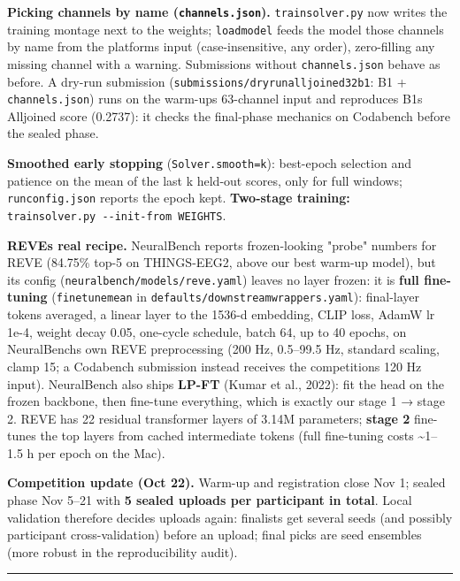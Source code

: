 \documentclass[
  11pt,
]{article}
\renewcommand{\_}{\oldunderscore\allowbreak}
\begin{document}
\textbf{Picking channels by name
(\texttt{channels.json}).}
\texttt{train\_solver.py} now writes the
training montage next to the weights;
\texttt{load\_model} feeds the model
those channels by name from the
platform\textquotesingle s input
(case-insensitive, any order),
zero-filling any missing channel with a
warning. Submissions without
\texttt{channels.json} behave as before.
A dry-run submission
(\texttt{submissions/dryrun\_alljoined32\_b1}:
B1 + \texttt{channels.json}) runs on the
warm-up\textquotesingle s 63-channel
input and reproduces
B1\textquotesingle s Alljoined score
(0.2737): it checks the final-phase
mechanics on Codabench before the sealed
phase.

\textbf{Smoothed early stopping}
(\texttt{Solver.smooth=k}): best-epoch
selection and patience on the mean of
the last k held-out scores, only for
full windows; \texttt{run\_config.json}
reports the epoch kept.
\textbf{Two-stage training:}
\texttt{train\_solver.py\ -\/-init-from\ WEIGHTS}.

\textbf{REVE\textquotesingle s real
recipe.} NeuralBench reports
frozen-looking "probe" numbers for REVE
(84.75\% top-5 on THINGS-EEG2, above our
best warm-up model), but its config
(\texttt{neuralbench/models/reve.yaml})
leaves no layer frozen: it is
\textbf{full fine-tuning}
(\texttt{finetune\_mean} in
\texttt{defaults/downstream\_wrappers.yaml}):
final-layer tokens averaged, a linear
layer to the 1536-d embedding, CLIP
loss, AdamW lr 1e-4, weight decay 0.05,
one-cycle schedule, batch 64, up to 40
epochs, on NeuralBench\textquotesingle s
own REVE preprocessing (200 Hz,
0.5--99.5 Hz, standard scaling, clamp
15; a Codabench submission instead
receives the
competition\textquotesingle s 120 Hz
input). NeuralBench also ships
\textbf{LP-FT} (Kumar et al., 2022): fit
the head on the frozen backbone, then
fine-tune everything, which is exactly
our stage 1 → stage 2. REVE has 22
residual transformer layers of 3.14M
parameters; \textbf{stage 2} fine-tunes
the top layers from cached intermediate
tokens (full fine-tuning costs
\textasciitilde1--1.5 h per epoch on the
Mac).

\textbf{Competition update (Oct 22).}
Warm-up and registration close Nov 1;
sealed phase Nov 5--21 with \textbf{5
sealed uploads per participant in
total}. Local validation therefore
decides uploads again: finalists get
several seeds (and possibly participant
cross-validation) before an upload;
final picks are seed ensembles (more
robust in the reproducibility audit).

\begin{center}\rule{0.5\linewidth}{0.5pt}\end{center}
\end{document}
